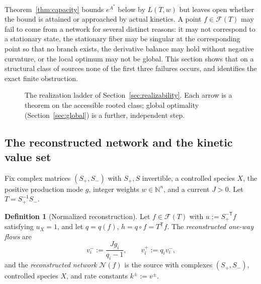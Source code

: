 \documentclass[11pt,reqno]{amsart}
\theoremstyle{plain}
\theoremstyle{definition}
\newtheorem{definition}[theorem]{Definition}
\theoremstyle{remark}
\numberwithin{equation}{section}
\newcommand{\R}{\mathbb{R}}
\newcommand{\N}{\mathbb{N}}
\newcommand{\Ker}{\operatorname{ker}}
\newcommand{\Sp}{S_{+}}
\newcommand{\Sm}{S_{-}}
\newcommand{\T}{\mathsf{T}}
\newcommand{\cone}{\mathcal{F}}
\renewcommand{\odot}{\circ}
\begin{document}
Theorem~\ref{thm:capacity} bounds $e^{A^*}$ below by $L(T,w)$ but leaves open whether the bound is attained or approached by actual kinetics.  A point $f\in\cone(T)$ may fail to come from a network for several distinct reasons: it may not correspond to a stationary state, the stationary fiber may be singular at the corresponding point so that no branch exists, the derivative balance may hold without negative curvature, or the local optimum may not be global.  This section shows that on a structural class of sources none of the first three failures occurs, and identifies the exact finite obstruction.

\begin{figure}[t]
\centering
{}
\caption{The realization ladder of Section~\ref{sec:realizability}.  Each arrow is a theorem on the accessible rooted class; global optimality (Section~\ref{sec:global}) is a further, independent step.}
\label{fig:ladder}
\end{figure}

\subsection{The reconstructed network and the kinetic value set}
Fix complex matrices $(\Sp,\Sm)$ with $\Sp,S$ invertible, a controlled species $X$, the positive production mode $g$, integer weights $w\in\N^n$, and a current $J>0$.  Let $T=\Sp^{-1}\Sm$.

\begin{definition}[Normalized reconstruction]\label{def:reconstruction}
Let $f\in\cone(T)$ with $u:=\Sp^{-\T}f$ satisfying $u_X=1$, and let $q=q(f)$, $h=q\odot f=T^{\T}f$.  The \emph{reconstructed one-way flows} are
\begin{equation}\label{eq:flows}
v^-_i:=\frac{Jg_i}{q_i-1},\qquad v^+_i:=q_iv^-_i,
\end{equation}
and the \emph{reconstructed network} $\mathcal N(f)$ is the source with complexes $(\Sp,\Sm)$, controlled species $X$, and rate constants $k^\pm:=v^\pm$.
\end{definition}
\end{document}

